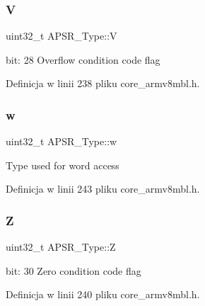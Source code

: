 \subsubsection{\texorpdfstring{V}{V}}
{\footnotesize\ttfamily uint32\+\_\+t A\+P\+S\+R\+\_\+\+Type\+::V}

bit\+: 28 Overflow condition code flag 

Definicja w linii 238 pliku core\+\_\+armv8mbl.\+h.

\mbox{\label{union_a_p_s_r___type_ae4c2ef8c9430d7b7bef5cbfbbaed3a94}} 
\subsubsection{\texorpdfstring{w}{w}}
{\footnotesize\ttfamily uint32\+\_\+t A\+P\+S\+R\+\_\+\+Type\+::w}

Type used for word access 

Definicja w linii 243 pliku core\+\_\+armv8mbl.\+h.

\mbox{\label{union_a_p_s_r___type_a3b04d58738b66a28ff13f23d8b0ba7e5}} 
\subsubsection{\texorpdfstring{Z}{Z}}
{\footnotesize\ttfamily uint32\+\_\+t A\+P\+S\+R\+\_\+\+Type\+::Z}

bit\+: 30 Zero condition code flag 

Definicja w linii 240 pliku core\+\_\+armv8mbl.\+h.



